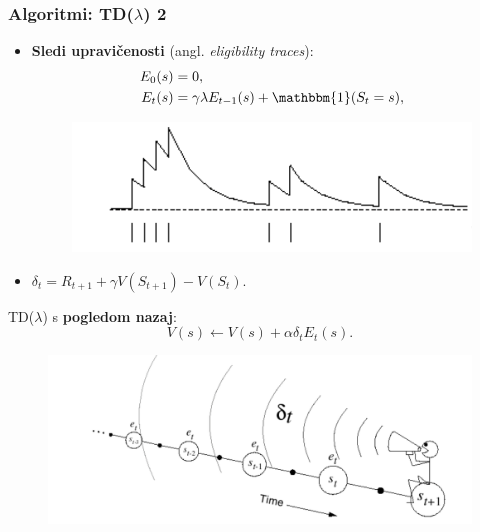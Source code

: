 \documentclass{beamer}    %
\begin{document}
\begin{frame}
    \frametitle{Algoritmi: TD($\lambda$) 2}
    \begin{itemize}
        \item \textbf{Sledi upravičenosti} (angl. \textit{eligibility traces}):
        \begin{align*}
            E_0(s) &= 0, \\
            E_t(s) &= \gamma \lambda E_{t-1}(s) + \mathbbm{1}(S_t = s),
        \end{align*}
    \begin{figure}
        \includegraphics[scale=0.25]{slike/et.png}
    \end{figure}
        \item $\delta_t = R_{t+1} + \gamma V(S_{t+1}) - V(S_t).$
    \end{itemize}

    \medskip
    \medskip
    \medskip
    TD($\lambda$) s \textbf{pogledom nazaj}: 
    $$
    V(s) \leftarrow V(s) + \alpha \delta_t E_t(s).
    $$
    \begin{figure}[b]
        \includegraphics[scale=0.35]{slike/pogled-nazaj.png}
    \end{figure}
\end{frame}
\end{document}
